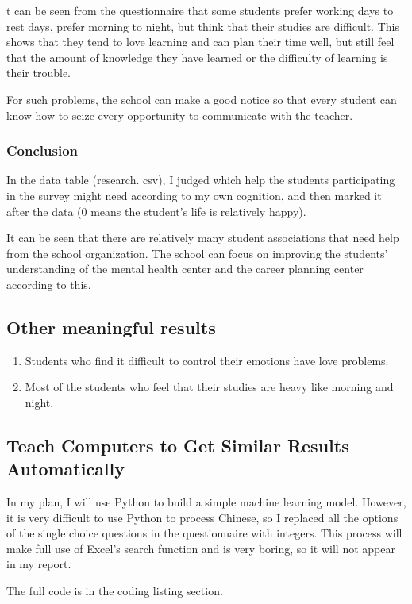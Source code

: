 \documentclass{article}
\begin{document}
t can be seen from the questionnaire that some students prefer working days to rest days, prefer morning to night, but think that their studies are difficult. This shows that they tend to love learning and can plan their time well, but still feel that the amount of knowledge they have learned or the difficulty of learning is their trouble.

For such problems, the school can make a good notice so that every student can know how to seize every opportunity to communicate with the teacher.

\subsubsection{Conclusion}
In the data table (research. csv), I judged which help the students participating in the survey might need according to my own cognition, and then marked it after the data (0 means the student's life is relatively happy).

It can be seen that there are relatively many student associations that need help from the school organization. The school can focus on improving the students' understanding of the mental health center and the career planning center according to this.

\subsection{Other meaningful results}

\begin{enumerate}
    \item Students who find it difficult to control their emotions have love problems.
    \item Most of the students who feel that their studies are heavy like morning and night.
\end{enumerate}

\subsection{Teach Computers to Get Similar Results Automatically}
In my plan, I will use Python to build a simple machine learning model. 
However, it is very difficult to use Python to process Chinese, so I replaced all the options of the single choice questions in the questionnaire with integers.
This process will make full use of Excel's search function and is very boring, so it will not appear in my report.

The full code is in the coding listing section.
\end{document}
